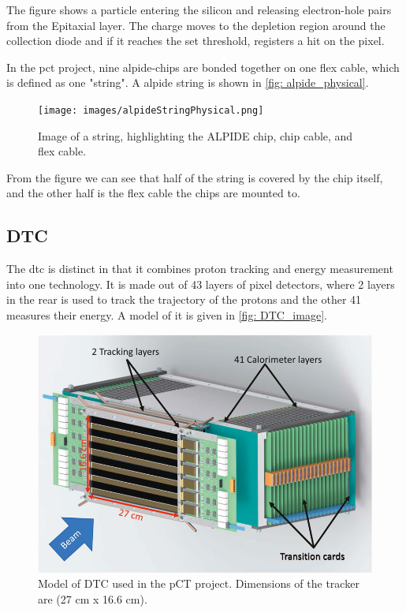 \documentclass[main.tex]{subfiles}
\begin{document}
The figure shows a particle entering the silicon and releasing electron-hole pairs from the Epitaxial layer. The charge moves to the depletion region around the collection diode and if it reaches the set threshold, registers a hit on the pixel.

In the \gls{pct} project, nine \gls{alpide}-chips are bonded together on one flex cable, which is defined as one "string". A \gls{alpide} string is shown in \autoref{fig: alpide_physical}.

\begin{figure}[!htpb]
    \centering
    \texttt{[image: images/alpideStringPhysical.png]}
    \caption{Image of a string, highlighting the ALPIDE chip, chip cable, and flex cable.}
    \label{fig: alpide_physical}
\end{figure}
\FloatBarrier

From the figure we can see that half of the string is covered by the chip itself, and the other half is the flex cable the chips are mounted to.

\subsection{DTC}

The \gls{dtc} is distinct in that it combines proton tracking and energy measurement into one technology. It is made out of 43 layers of pixel detectors, where 2 layers in the rear is used to track the trajectory of the protons and the other 41 measures their energy. A model of it is given in \autoref{fig: DTC_image}.

\begin{figure}[!ht]
    \centering
    \includegraphics[scale = 0.5]{images/dtc.jpg}
    \caption{Model of DTC used in the pCT project. Dimensions of the tracker are (27 cm x 16.6 cm).}
    \label{fig: DTC_image}
\end{figure}
\FloatBarrier
\end{document}
